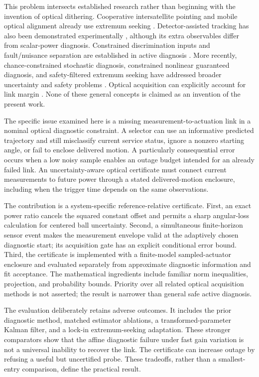 \documentclass[10pt,journal]{IEEEtran}
\begin{document}
This problem intersects established research rather than beginning with the invention of optical dithering. Cooperative intersatellite pointing and mobile optical alignment already use extremum seeking \cite{guelman,cai}. Detector-assisted tracking has also been demonstrated experimentally \cite{mai}, although its extra observables differ from scalar-power diagnosis. Constrained discrimination inputs and fault/nuisance separation are established in active diagnosis \cite{cheong,palmer}. More recently, chance-constrained stochastic diagnosis, constrained nonlinear guaranteed diagnosis, and safety-filtered extremum seeking have addressed broader uncertainty and safety problems \cite{guo,massa,safees}. Optical acquisition can explicitly account for link margin \cite{yan}. None of these general concepts is claimed as an invention of the present work.

The specific issue examined here is a missing measurement-to-actuation link in a nominal optical diagnostic constraint. A selector can use an informative predicted trajectory and still misclassify current service status, ignore a nonzero starting angle, or fail to enclose delivered motion. A particularly consequential error occurs when a low noisy sample enables an outage budget intended for an already failed link. An uncertainty-aware optical certificate must connect current measurements to future power through a stated delivered-motion enclosure, including when the trigger time depends on the same observations.

The contribution is a system-specific reference-relative certificate. First, an exact power ratio cancels the squared constant offset and permits a sharp angular-loss calculation for centered ball uncertainty. Second, a simultaneous finite-horizon sensor event makes the measurement envelope valid at the adaptively chosen diagnostic start; its acquisition gate has an explicit conditional error bound. Third, the certificate is implemented with a finite-model sampled-actuator enclosure and evaluated separately from approximate diagnostic information and fit acceptance. The mathematical ingredients include familiar norm inequalities, projection, and probability bounds. Priority over all related optical acquisition methods is not asserted; the result is narrower than general safe active diagnosis.

The evaluation deliberately retains adverse outcomes. It includes the prior diagnostic method, matched estimator ablations, a transformed-parameter Kalman filter, and a lock-in extremum-seeking adaptation. These stronger comparators show that the affine diagnostic failure under fast gain variation is not a universal inability to recover the link. The certificate can increase outage by refusing a useful but uncertified probe. These tradeoffs, rather than a smallest-entry comparison, define the practical result.
\end{document}
